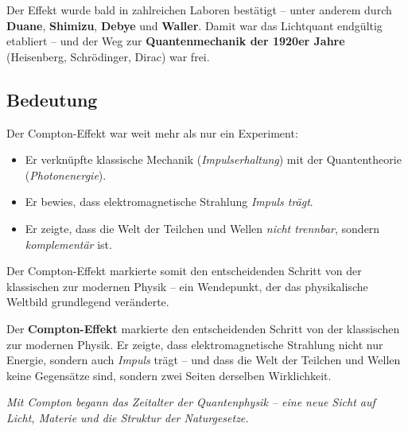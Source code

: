 Der Effekt wurde bald in zahlreichen Laboren bestätigt – unter anderem durch \textbf{Duane}, \textbf{Shimizu}, \textbf{Debye} und \textbf{Waller}.  
Damit war das Lichtquant endgültig etabliert – und der Weg zur \textbf{Quantenmechanik der 1920er Jahre} 
(Heisenberg, Schrödinger, Dirac) war frei.

\vspace{1em}
\subsection{Bedeutung}

Der Compton-Effekt war weit mehr als nur ein Experiment:

\begin{itemize}
	\item Er verknüpfte klassische Mechanik (\emph{Impulserhaltung}) mit der Quantentheorie (\emph{Photonenergie}).
	\item Er bewies, dass elektromagnetische Strahlung \emph{Impuls trägt}.
	\item Er zeigte, dass die Welt der Teilchen und Wellen \emph{nicht trennbar}, sondern \emph{komplementär} ist.
\end{itemize}

Der Compton-Effekt markierte somit den entscheidenden Schritt von der klassischen zur modernen Physik – 
ein Wendepunkt, der das physikalische Weltbild grundlegend veränderte.
\begin{DidaktikBox}
	Der \textbf{Compton-Effekt} markierte den entscheidenden Schritt von der klassischen zur modernen Physik. 
	Er zeigte, dass elektromagnetische Strahlung nicht nur Energie, sondern auch \emph{Impuls} trägt – 
	und dass die Welt der Teilchen und Wellen keine Gegensätze sind, sondern zwei Seiten derselben Wirklichkeit. 
	
	\vspace{0.5em}
	\emph{Mit Compton begann das Zeitalter der Quantenphysik – 
		eine neue Sicht auf Licht, Materie und die Struktur der Naturgesetze.}
	\label{box:FazitCompton}
\end{DidaktikBox}


